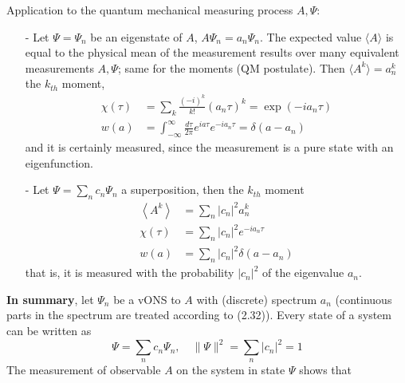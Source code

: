 Application to the quantum mechanical measuring process {$A,\Psi$}:
\begin{itemize}
    \item[-] Let $\Psi=\Psi_n$ be an eigenstate of $A$, $A\Psi_n=a_n\Psi_n$. The expected value $\langle A\rangle$ is equal to the physical mean of the measurement results over many equivalent measurements {$A,\Psi$}; same for the moments    (QM postulate). Then $\langle A^k\rangle=a_n^k$ the $k_{th}$ moment,%
    \begin{equation}
    \begin{aligned} \chi(\tau) &=\sum_{k} \frac{(-i)^{k}}{k !}\left(a_{n} \tau\right)^{k}=\exp \left(-i a_{n} \tau\right) \\ w(a) &=\int_{-\infty}^{\infty} \frac{d \tau}{2 \pi} e^{i a \tau} e^{-i a_{n} \tau}=\delta\left(a-a_{n}\right) \end{aligned}
    \end{equation}
    and it is certainly measured, since the measurement is a pure state with an eigenfunction.
    \item[-] Let $\Psi=\sum_n c_n\Psi_n$ a superposition, then the $k_{th}$ moment
    \begin{equation}
    \begin{aligned}\left\langle A^{k}\right\rangle &=\sum_{n}\left|c_{n}\right|^{2} a_{n}^{k} \\ \chi(\tau) &=\sum_{n}\left|c_{n}\right|^{2} e^{-i a_{n} \tau} \\ w(a) &=\sum_{n}\left|c_{n}\right|^{2} \delta\left(a-a_{n}\right) \end{aligned}
    \end{equation}
    that is, it is measured with the probability $| c_n|^2$ of the eigenvalue $a_n$.
\end{itemize}
\textbf{In summary}, let {$\Psi_n$} be a vONS to $A$ with (discrete) spectrum {$a_n$} (continuous parts in the spectrum are treated according to (2.32)). Every state of a system can be written as
\begin{equation}
    \Psi=\sum_{n} c_{n} \Psi_{n}, \quad\|\Psi\|^{2}=\sum_{n}\left|c_{n}\right|^{2}=1
    \end{equation}
The measurement of observable $A$ on the system in state $\Psi$ shows that

